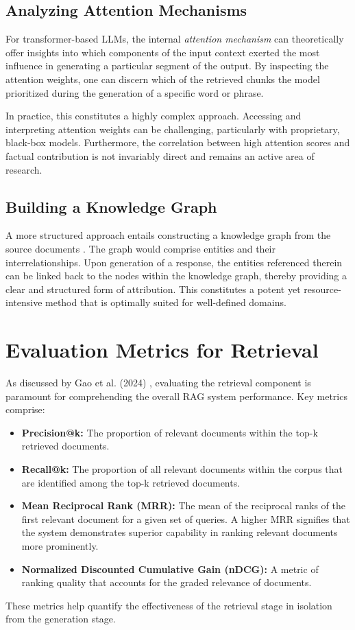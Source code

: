 \subsection{Analyzing Attention Mechanisms}
For transformer-based LLMs, the internal \textit{attention mechanism} can theoretically offer insights into which components of the input context exerted the most influence in generating a particular segment of the output. By inspecting the attention weights, one can discern which of the retrieved chunks the model prioritized during the generation of a specific word or phrase.

In practice, this constitutes a highly complex approach. Accessing and interpreting attention weights can be challenging, particularly with proprietary, black-box models. Furthermore, the correlation between high attention scores and factual contribution is not invariably direct and remains an active area of research.

\subsection{Building a Knowledge Graph}
A more structured approach entails constructing a knowledge graph from the source documents \autocite{gao2024retrievalaugmented}. The graph would comprise entities and their interrelationships. Upon generation of a response, the entities referenced therein can be linked back to the nodes within the knowledge graph, thereby providing a clear and structured form of attribution. This constitutes a potent yet resource-intensive method that is optimally suited for well-defined domains.

\section{Evaluation Metrics for Retrieval}
As discussed by Gao et al. (2024) \autocite{gao2024retrievalaugmented}, evaluating the retrieval component is paramount for comprehending the overall RAG system performance. Key metrics comprise:
\begin{itemize}
    \item \textbf{Precision@k:} The proportion of relevant documents within the top-k retrieved documents.
    \item \textbf{Recall@k:} The proportion of all relevant documents within the corpus that are identified among the top-k retrieved documents.
    \item \textbf{Mean Reciprocal Rank (MRR):} The mean of the reciprocal ranks of the first relevant document for a given set of queries. A higher MRR signifies that the system demonstrates superior capability in ranking relevant documents more prominently.
    \item \textbf{Normalized Discounted Cumulative Gain (nDCG):} A metric of ranking quality that accounts for the graded relevance of documents.
\end{itemize}
These metrics help quantify the effectiveness of the retrieval stage in isolation from the generation stage.
